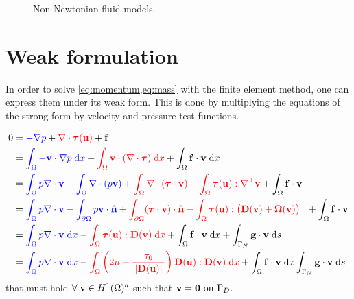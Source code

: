\documentclass[11 pt]{report}
\begin{document}
\begin{figure}[!t]
    \centering
    
    \caption{Non-Newtonian fluid models.}
    \label{fig:fluid-classification}
\end{figure}


\section{Weak formulation}
In order to solve \cref{eq:momentum,eq:mass} with the finite element method, one can express them under its weak form. This is done by multiplying the equations of the strong form by velocity and pressure test functions.

\begin{equation}
    \begin{aligned}
        0 &= {\color{blue}-\nabla p} + {\color{red} \nabla \cdot \boldsymbol{\tau}(\mathbf{u})} + \mathbf{f}\\
        &= {\color{blue} \int_{\Omega} - \mathbf{v} \cdot \nabla p \;\dd x} + {\color{red} \int_{\Omega} \mathbf{v} \cdot (\nabla \cdot \boldsymbol{\tau}) \;\dd x} + \int_{\Omega} \mathbf{f} \cdot \mathbf{v}  \;\dd x\\
        &= {\color{blue} \int_{\Omega} p \nabla \cdot \mathbf{v} - \int_{\Omega} \nabla \cdot (p\mathbf{v})} + {\color{red} \int_{\Omega} \nabla \cdot (\boldsymbol{\tau} \cdot \mathbf{v}) - \int_{\Omega}  \boldsymbol{\tau} (\mathbf{u}) : \nabla^\top \mathbf{v}} + \int_{\Omega} \mathbf{f} \cdot \mathbf{v}\\
        &= {\color{blue} \int_{\Omega} p \nabla \cdot \mathbf{v} - \int_{\partial \Omega} p \mathbf{v} \cdot \mathbf{\hat n}} + {\color{red} \int_{\partial\Omega} (\boldsymbol{\tau} \cdot \mathbf{v}) \cdot \mathbf{\hat n} - \int_{\Omega}  \boldsymbol{\tau} (\mathbf{u}) : \big(\mathbf{D}(\mathbf{v}) + \mathbf{\Omega}(\mathbf{v})\big)^\top} + \int_{\Omega} \mathbf{f} \cdot \mathbf{v} \\
        &= {\color{blue} \int_{\Omega} p \nabla \cdot \mathbf{v} \;\dd x} - {\color{red} \int_{\Omega}  \boldsymbol{\tau} (\mathbf{u}) : \mathbf{D}(\mathbf{v}) \;\dd x} + \int_{\Omega} \mathbf{f} \cdot \mathbf{v} \;\dd x + \int_{\Gamma_N} \mathbf{g} \cdot \mathbf{v} \; \dd s\\
        &= {\color{blue} \int_{\Omega} p \nabla \cdot \mathbf{v} \;\dd x} - {\color{red} \int_{\Omega}  \left( 2\mu + \frac{\tau_0}{\|\mathbf{D}(\mathbf{u})\|} \right) \mathbf{D}(\mathbf{u}) : \mathbf{D}(\mathbf{v}) \;\dd x} + \int_{\Omega} \mathbf{f} \cdot \mathbf{v} \;\dd x \int_{\Gamma_N} \mathbf{g} \cdot \mathbf{v} \; \dd s
    \end{aligned}\label{eq:weak_formulation}
\end{equation}
that must hold $\forall \; \mathbf{v} \in H^1(\Omega)^d$ such that $\mathbf{v} = \mathbf{0} \text{ on } \Gamma_D$.
\end{document}
